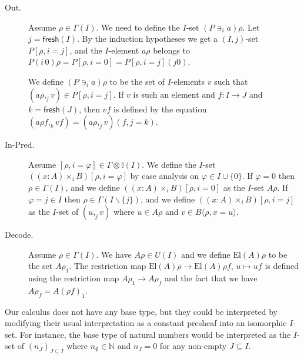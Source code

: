 \documentclass[english]{PaperTools/latex/lipics}
\newcommand\CTimes[2]{(#2) ×_{#1}}
\newcommand\op[1]{∋_{#1}}
\def\fresh#1{\mathsf{fresh}(#1)}
\def\El#1{\mathrm{El}(#1)}
\begin{document}
\begin{description}
  \item[\sc Out.]
    Assume $ρ ∈ Γ(I)$. We need to define the $I$-set $(P \op {i} a)ρ$.
    Let $j = \fresh I$.
    By the induction hypotheses we get a $(I,j)$-set $P[ρ,i=j]$,
    and the $I$-element $aρ$ belongs to
    $P(i\,0)ρ = P[ρ,i=0] = P[ρ,i=j](j 0)$.

    We define $(P \op {i} a)ρ$ to be the set of $I$-elements $v$ such that
    $(aρ,_j v) ∈ P[ρ,i=j]$.
    If $v$ is such an element and $f : I → J$ and $k=\fresh J$, then
    $vf$ is defined by the equation $(aρf,_k vf) = (aρ ,_j v)(f, j=k)$.


  \item[\sc In-Pred.]
    Assume $[ρ,i=φ] ∈ Γ⊗𝕀(I)$.  We define the $I$-set $(\CTimes i {x:A} B)[ρ,i=φ]$
    by case analysis on $φ ∈ I∪\{0\}$.
    If $φ = 0$ then $ρ ∈ Γ(I)$, and we define $(\CTimes i {x:A} B)[ρ,i=0]$ as
    the $I$-set $Aρ$.
    If $φ = j ∈ I$ then $ρ ∈ Γ(I\backslash\{j\})$, and we define
    $(\CTimes i {x:A} B)[ρ,i=j]$ as the $I$-set of $(u ,_j v)$ where
    $u ∈ Aρ$ and $v ∈ B⟨ρ,x=u⟩$.


  \item[\sc Decode.]
    Assume $ρ ∈ Γ(I)$.  We have $Aρ ∈ U(I)$ and we define
    $\El{A}ρ$ to be the set $Aρ_1$.
    The restriction map $\El{A}ρ → \El{A}ρf$, $u ↦ uf$ is defined
    using the restriction map $Aρ_1 → Aρ_f$ and the fact that we have
    $Aρ_f = A(ρf)_1$.
\end{description}

\begin{remark}
  Our calculus does not have any base type, but they could be interpreted
  by modifying their usual interpretation as a constant presheaf into an
  isomorphic $I$-set.
  For instance, the base type of natural numbers would be interpreted as
  the $I$-set of $(n_J)_{J ⊆ I}$ where $n_∅ ∈ ℕ$ and $n_J = 0$ for any
  non-empty $J ⊆ I$.
\end{remark}
\end{document}
